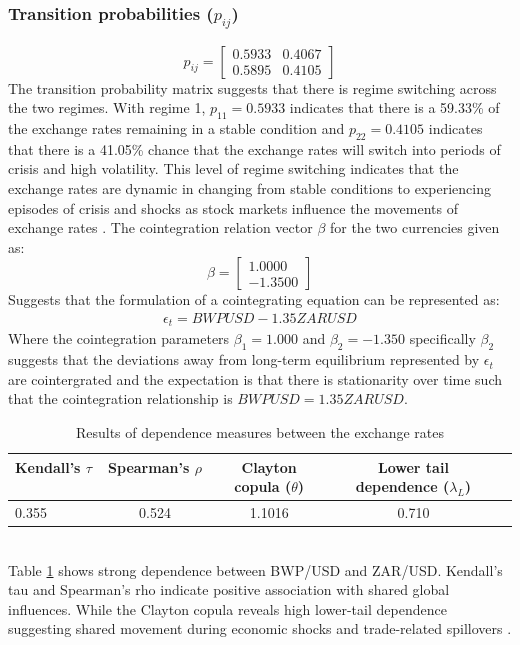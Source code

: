 \documentclass[a4paper]{article}
\theoremstyle{plain}
\theoremstyle{definition}
\theoremstyle{remark}
\begin{document}
\subsubsection*{Transition probabilities ($p_{ij}$)}
\[
p_{ij} = 
\begin{bmatrix}
0.5933 & 0.4067 \\
0.5895 & 0.4105
\end{bmatrix}
\]
The transition probability matrix suggests that there is regime switching across the two regimes. With regime 1, $p_{11} = 0.5933$ indicates that there is a 59.33\% of the exchange rates remaining in a stable condition and $p_{22} = 0.4105$ indicates that there is a 41.05\% chance that the exchange rates will switch into periods of crisis and high volatility. This level of regime switching indicates that the exchange rates are dynamic in changing from stable conditions to experiencing episodes of crisis and shocks as stock markets influence the movements of exchange rates \citep{chkili2014exchange}.
The cointegration relation vector $\beta$ for the two currencies given as:
\[
\beta = 
\begin{bmatrix}
1.0000 \\ -1.3500
\end{bmatrix}
\]
Suggests that the formulation of a cointegrating equation can be represented as:
\begin{align}\label{Cointegration}
   \epsilon_{t}= BWPUSD -1.35 ZARUSD 
\end{align}
Where the cointegration parameters $\beta_{1} =1.000$ and $\beta_{2}= -1.350$ specifically $\beta_{2}$ suggests that the deviations away from long-term equilibrium represented by $\epsilon_{t}$ are cointergrated and the expectation is that there is stationarity over time such that the cointegration relationship is $BWPUSD = 1.35ZARUSD$.
\begin{table}[h]
    \centering
     \caption{Results of dependence measures between the exchange rates}
     \vspace{0.5cm}
    \begin{tabular}{lcccc}
    \hline
    Kendall's \(\tau\)\ & Spearman's \(\rho\)\ & Clayton copula ($\theta$) & Lower tail dependence (\(\lambda_L\)) \\ 
    \hline
    0.355&0.524&1.1016&0.710 \\
    \bottomrule
    \end{tabular}
    \label{tab:dependence}
\end{table}\\  
Table \ref{tab:dependence} shows strong dependence between BWP/USD and ZAR/USD. Kendall’s tau and Spearman’s rho indicate positive association with  shared global influences. While the Clayton copula reveals high lower-tail dependence suggesting  shared movement during economic shocks and trade-related spillovers \citep{chlond2018costs}.
\end{document}
